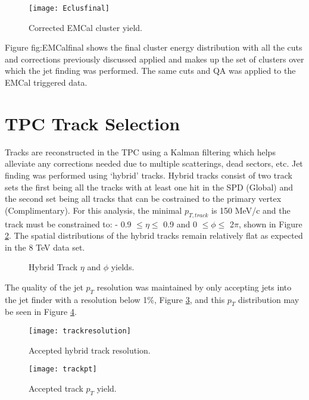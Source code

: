 \begin{figure}[h]
\texttt{[image: Eclusfinal]}
\centering
\caption{Corrected EMCal cluster yield.}
\label{fig:EMCalfinal}
\end{figure}
\newpage

Figure {fig:EMCalfinal} shows the final cluster energy distribution with all the cuts and corrections previously discussed applied and makes up the set of clusters over which the jet finding was performed.  The same cuts and QA was applied to the EMCal triggered data.
 
\section{TPC Track Selection}

Tracks are reconstructed in the TPC using a Kalman filtering which helps alleviate any corrections needed due to multiple scatterings, dead sectors, etc.  Jet finding was performed using `hybrid' tracks.  Hybrid tracks consist of two track sets the first being all the tracks with at least one hit in the SPD (Global) and the second set being all tracks that can be costrained to the primary vertex (Complimentary).  For this analysis, the minimal $p_{T, track}$ is 150 MeV/c and the track must be constrained to: - 0.9 $\leq \eta \leq$ 0.9 and 0 $\leq \phi \leq$ 2$\pi$, shown in Figure \ref{fig:Hybridtracketaphi}.  The spatial distributions of the hybrid tracks remain relatively flat as expected in the 8 TeV data set.

\begin{figure}%
    \centering
    \qquad
    \caption{Hybrid Track $\eta$ and $\phi$ yields.}%
    \label{fig:Hybridtracketaphi}%
\end{figure}

\noindent
The quality of the jet $p_{T}$ resolution was maintained by only accepting jets into the jet finder with a resolution below 1\%, Figure \ref{fig:trackresolution}, and this $p_{T}$ distribution may be seen in Figure \ref{fig:hybtrackpt}.

\begin{figure}[h]
\texttt{[image: trackresolution]}
\centering
\caption{Accepted hybrid track resolution.}
\label{fig:trackresolution}
\end{figure}

\begin{figure}[h]
\texttt{[image: trackpt]}
\centering
\caption{Accepted track $p_{T}$ yield.}
\label{fig:hybtrackpt}
\end{figure}

